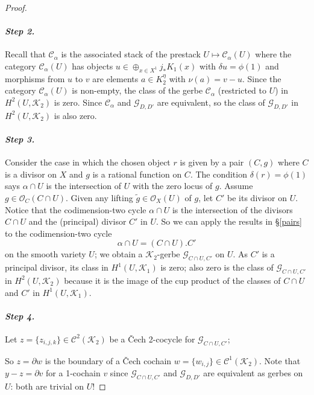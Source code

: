 \documentclass{amsart}
\numberwithin{equation}{subsection}
\theoremstyle{remark}
\theoremstyle{remark}
\newcommand{\cC}{\mathcal{C}}
\newcommand{\cG}{\mathcal{G}}
\newcommand{\cK}{\mathcal{K}}
\newcommand{\cO}{\mathcal{O}}
\begin{document}
\begin{proof}
\paragraph{\textit{Step 2.}} Recall that $\cC_{\alpha}$ is the associated stack of the prestack $U \mapsto \cC_{\alpha}(U)$ where the category $\cC_{\alpha}(U)$ has objects $u \in \oplus_{x \in X^1} j_* K_1(x)$ with  $\delta{u} = \phi(1)$ and morphisms from $u$ to $v$ are elements $a \in K_2^{\eta}$ with $\nu(a) = v-u$. 
 Since the category $\cC_{\alpha}(U)$ is non-empty, the class of the gerbe $\cC_{\alpha}$ (restricted to $U$) in $H^2(U, \cK_2)$ is zero. Since $\cC_{\alpha}$ and $\cG_{D, D'}$ are equivalent,  so the class of $\cG_{D, D'}$ in $H^2(U, \cK_2)$ is also zero.\vspace*{1em}
 
\paragraph{\textit{Step 3.}} Consider the case in which  the chosen object $r$ is given by a pair $(C, g)$ where $C$ is a divisor on $X$ and $g$ is a rational function on $C$. The condition $\delta(r) = \phi(1)$ says $\alpha \cap U$ is the intersection of $U$ with the zero locus of $g$. Assume $g \in \cO_C(C \cap U)$. Given any lifting $\tilde{g} \in \cO_X(U)$ of $g$, let  $C'$ be its divisor on $U$.  Notice that the codimension-two cycle $\alpha \cap U$ is the intersection of the divisors $C \cap U$ and the (principal) divisor $C'$ in $U$. So we can apply the results in \S \ref{pairs} to the codimension-two cycle \[\alpha \cap U = (C\cap U). C'\] on the smooth variety $U$; we obtain  a $\cK_2$-gerbe $\cG_{C\cap U, C'}$ on $U$. As $C'$ is a  principal divisor, its class in $H^1(U, \cK_1)$ is zero; also zero is the class of $\cG_{C\cap U, C'}$ in $H^2(U, \cK_2)$ because it is the image of the cup product of the classes of $C \cap U$ and $C'$ in $H^1(U, \cK_1)$.\vspace*{1em} 

\paragraph{\textit{Step 4.}} Let  $z =\{z_{i,j,k}\} \in \cC^2(\cK_2)$ be a \v Cech 2-cocycle for $\cG_{C\cap U, C'}$; 

 So $z = \partial w$ is the boundary of a \v Cech cochain $w = \{w_{i,j}\} \in \cC^1(\cK_2)$. Note that 
 $y - z = \partial v$ for a 1-cochain $v$ since $\cG_{C\cap U, C'}$ and $\cG_{D, D'}$  are equivalent as gerbes on $U$: both are trivial on $U$!


\end{proof}
\end{document}
